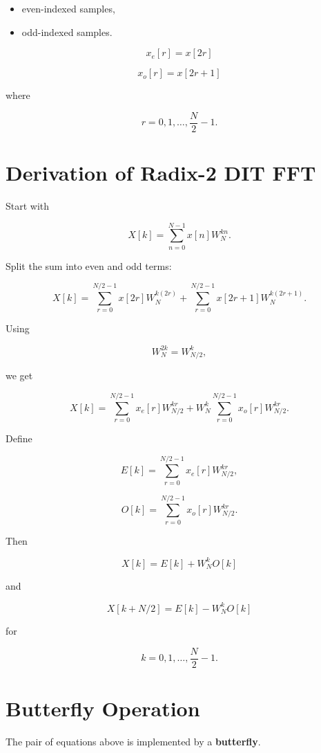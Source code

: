 \begin{itemize}
\item even-indexed samples,
\item odd-indexed samples.
\end{itemize}

\[
x_e[r]=x[2r]
\]

\[
x_o[r]=x[2r+1]
\]

where

\[
r=0,1,\ldots,\frac{N}{2}-1.
\]


\section{Derivation of Radix-2 DIT FFT}

Start with

\[
X[k]=
\sum_{n=0}^{N-1}x[n]W_N^{kn}.
\]

Split the sum into even and odd terms:

\[
X[k]=
\sum_{r=0}^{N/2-1}x[2r]W_N^{k(2r)}
+
\sum_{r=0}^{N/2-1}x[2r+1]W_N^{k(2r+1)}.
\]

Using

\[
W_N^{2k}=W_{N/2}^k,
\]

we get

\[
X[k]=
\sum_{r=0}^{N/2-1}x_e[r]W_{N/2}^{kr}
+
W_N^k
\sum_{r=0}^{N/2-1}x_o[r]W_{N/2}^{kr}.
\]

Define

\[
E[k]=
\sum_{r=0}^{N/2-1}x_e[r]W_{N/2}^{kr},
\]

\[
O[k]=
\sum_{r=0}^{N/2-1}x_o[r]W_{N/2}^{kr}.
\]

Then

\[
\boxed{
X[k]=E[k]+W_N^kO[k]
}
\]

and

\[
\boxed{
X[k+N/2]=E[k]-W_N^kO[k]
}
\]

for

\[
k=0,1,\ldots,\frac{N}{2}-1.
\]


\section{Butterfly Operation}

The pair of equations above is implemented by a \textbf{butterfly}.

\begin{center}
\end{center}

